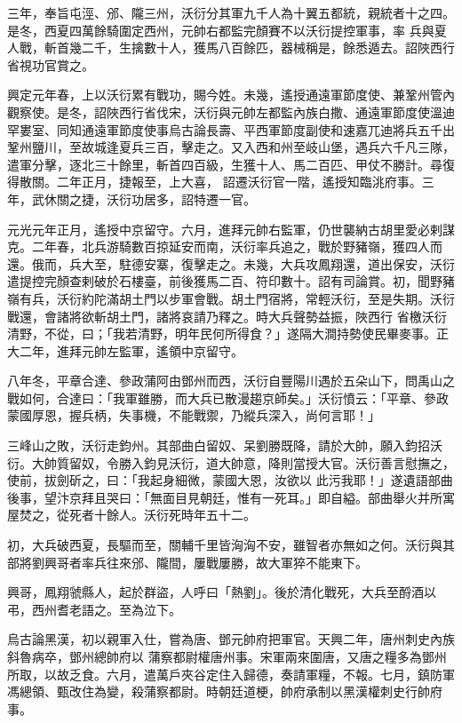 \begin{pinyinscope}
 三年，奉旨屯涇、邠、隴三州，沃衍分其軍九千人為十翼五都統，親統者十之四。是冬，西夏四萬餘騎圍定西州，元帥右都監完顏賽不以沃衍提控軍事，率
 兵與夏人戰，斬首幾二千，生擒數十人，獲馬八百餘匹，器械稱是，餘悉遁去。詔陜西行省視功官賞之。



 興定元年春，上以沃衍累有戰功，賜今姓。未幾，遙授通遠軍節度使、兼鞏州管內觀察使。是冬，詔陜西行省伐宋，沃衍與元帥左都監內族白撒、通遠軍節度使溫迪罕婁室、同知通遠軍節度使事烏古論長壽、平西軍節度副使和速嘉兀迪將兵五千出鞏州鹽川，至故城逢夏兵三百，擊走之。又入西和州至岐山堡，遇兵六千凡三隊，遣軍分擊，逐北三十餘里，斬首四百級，生獲十人、馬二百匹、甲仗不勝計。尋復得散關。二年正月，捷報至，上大喜，
 詔遷沃衍官一階，遙授知臨洮府事。三年，武休關之捷，沃衍功居多，詔特遷一官。



 元光元年正月，遙授中京留守。六月，進拜元帥右監軍，仍世襲納古胡里愛必剌謀克。二年春，北兵游騎數百掠延安而南，沃衍率兵追之，戰於野豬嶺，獲四人而還。俄而，兵大至，駐德安寨，復擊走之。未幾，大兵攻鳳翔還，道出保安，沃衍遣提控完顏查剌破於石樓臺，前後獲馬二百、符印數十。詔有司論賞。初，聞野豬嶺有兵，沃衍約陀滿胡土門以步軍會戰。胡土門宿將，常輕沃衍，至是失期。沃衍戰還，會諸將欲斬胡土門，諸將哀請乃釋之。時大兵聲勢益振，陜西行
 省檄沃衍清野，不從，曰；「我若清野，明年民何所得食？」遂隔大澗持勢使民畢麥事。正大二年，進拜元帥左監軍，遙領中京留守。



 八年冬，平章合達、參政蒲阿由鄧州而西，沃衍自豐陽川遇於五朵山下，問禹山之戰如何，合達曰：「我軍雖勝，而大兵已散漫趨京師矣。」沃衍憤云：「平章、參政蒙國厚恩，握兵柄，失事機，不能戰禦，乃縱兵深入，尚何言耶！」



 三峰山之敗，沃衍走鈞州。其部曲白留奴、呆劉勝既降，請於大帥，願入鈞招沃衍。大帥質留奴，令勝入鈞見沃衍，道大帥意，降則當授大官。沃衍善言慰撫之，使前，拔劍斫之，曰：「我起身細微，蒙國大恩，汝欲以
 此污我耶！」遂遺語部曲後事，望汴京拜且哭曰：「無面目見朝廷，惟有一死耳。」即自縊。部曲舉火并所寓屋焚之，從死者十餘人。沃衍死時年五十二。



 初，大兵破西夏，長驅而至，關輔千里皆洶洶不安，雖智者亦無如之何。沃衍與其部將劉興哥者率兵往來邠、隴間，屢戰屢勝，故大軍猝不能東下。



 興哥，鳳翔虢縣人，起於群盜，人呼曰「熱劉」。後於清化戰死，大兵至酹酒以弔，西州耆老語之。至為泣下。



 烏古論黑漢，初以親軍入仕，嘗為唐、鄧元帥府把軍官。天興二年，唐州刺史內族斜魯病卒，鄧州總帥府以
 蒲察都尉權唐州事。宋軍兩來圍唐，又唐之糧多為鄧州所取，以故乏食。六月，遣萬戶夾谷定住入歸德，奏請軍糧，不報。七月，鎮防軍馮總領、甄改住為變，殺蒲察都尉。時朝廷道梗，帥府承制以黑漢權刺史行帥府事。




\end{pinyinscope}
